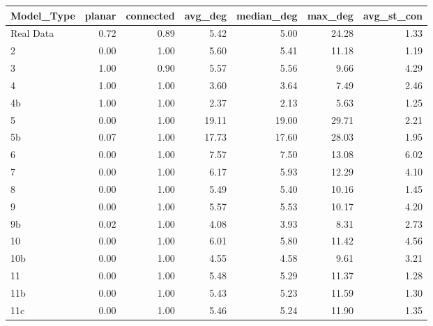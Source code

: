 \begin{tabular}{lrrrrrr}
\toprule
Model_Type & planar & connected & avg_deg & median_deg & max_deg & avg_st_con \\
\midrule
Real Data & 0.72 & 0.89 & 5.42 & 5.00 & 24.28 & 1.33 \\
2 & 0.00 & 1.00 & 5.60 & 5.41 & 11.18 & 1.19 \\
3 & 1.00 & 0.90 & 5.57 & 5.56 & 9.66 & 4.29 \\
4 & 1.00 & 1.00 & 3.60 & 3.64 & 7.49 & 2.46 \\
4b & 1.00 & 1.00 & 2.37 & 2.13 & 5.63 & 1.25 \\
5 & 0.00 & 1.00 & 19.11 & 19.00 & 29.71 & 2.21 \\
5b & 0.07 & 1.00 & 17.73 & 17.60 & 28.03 & 1.95 \\
6 & 0.00 & 1.00 & 7.57 & 7.50 & 13.08 & 6.02 \\
7 & 0.00 & 1.00 & 6.17 & 5.93 & 12.29 & 4.10 \\
8 & 0.00 & 1.00 & 5.49 & 5.40 & 10.16 & 1.45 \\
9 & 0.00 & 1.00 & 5.57 & 5.53 & 10.17 & 4.20 \\
9b & 0.02 & 1.00 & 4.08 & 3.93 & 8.31 & 2.73 \\
10 & 0.00 & 1.00 & 6.01 & 5.80 & 11.42 & 4.56 \\
10b & 0.00 & 1.00 & 4.55 & 4.58 & 9.61 & 3.21 \\
11 & 0.00 & 1.00 & 5.48 & 5.29 & 11.37 & 1.28 \\
11b & 0.00 & 1.00 & 5.43 & 5.23 & 11.59 & 1.30 \\
11c & 0.00 & 1.00 & 5.46 & 5.24 & 11.90 & 1.35 \\
\bottomrule
\end{tabular}
